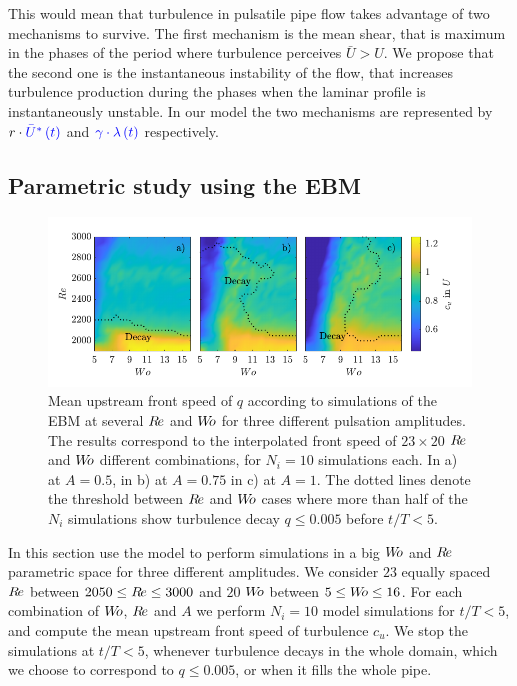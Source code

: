 \documentclass{article}
\DeclareRobustCommand{\Reynolds}{\ensuremath{R\hspace{-0.1em}e}\xspace}     %
\DeclareRobustCommand{\Womersley}{\ensuremath{W\hspace{-0.25em}o}\xspace}    %
\DeclareRobustCommand{\Amplitude}{\ensuremath{A}\xspace}    %
\begin{document}
This would mean that turbulence in pulsatile pipe flow takes advantage of two mechanisms to survive. The first mechanism is the mean shear, that is maximum in the phases of the period where turbulence perceives $\bar{U}>U$. We propose that the second one is the instantaneous instability of the flow, that increases turbulence production during the phases when the laminar profile is instantaneously unstable. In our model the two mechanisms are represented by $r \cdot \textcolor{blue}{\bar{U}^{*}\left(t\right)}$ and $\textcolor{blue}{\gamma \cdot \lambda \left( t \right)}$ respectively.



\subsection{Parametric study using the EBM}
\begin{figure}
\centering
\includegraphics[width=\textwidth, trim=0mm 0mm 0mm 0mm, clip=true]{Figures9/Fig5.pdf}
\caption{Mean upstream front speed of $q$ according to simulations of the EBM at several \Reynolds and \Womersley for three different pulsation amplitudes. The results correspond to the interpolated front speed of $23\times20$ \Reynolds and \Womersley different combinations, for $N_{i}=10$ simulations each. In a) at $\Amplitude=0.5$, in b) at $\Amplitude=0.75$ in c) at $\Amplitude=1$. The dotted lines denote the threshold between \Reynolds and \Womersley cases where more than half of the $N_{i}$ simulations show turbulence decay $q\leq0.005$ before $t/T<5$.}
\label{fig:fig5}
\end{figure}

In this section use the model to perform simulations in a big \Womersley and \Reynolds parametric space for three different amplitudes. We consider $23$ equally spaced \Reynolds between $2050\leq \Reynolds \leq 3000$ and $20$ \Womersley between $5\leq \Womersley \leq 16$. For each combination of \Womersley, \Reynolds and \Amplitude we perform $N_{i}=10$ model simulations for $t/T<5$, and compute the mean upstream front speed of turbulence $c_{u}$. We stop the simulations at $t/T<5$, whenever turbulence decays in the whole domain, which we choose to correspond to $q \leq 0.005$, or when it fills the whole pipe. 
\end{document}
